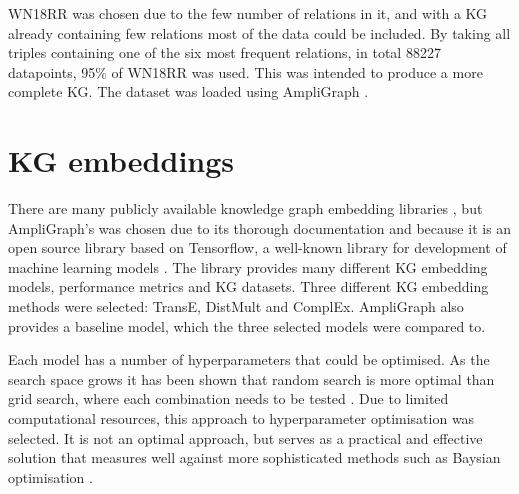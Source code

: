 WN18RR was chosen due to the few number of relations in it, and with a KG already containing few relations most of the data could be included.
By taking all triples containing one of the six most frequent relations, in total 88227 datapoints, 95\% of WN18RR was used. This was intended to produce a more complete KG. The dataset was loaded using AmpliGraph \cite{ampligraph}.

\section{KG embeddings}
There are many publicly available knowledge graph embedding libraries \cite{libkge, chandrahas-etal-2018-towards, ali2021pykeen}, but AmpliGraph's was chosen due to its thorough documentation and because it is an open source library based on Tensorflow, a well-known library for development of machine learning models \cite{tensorflow}. The library provides many different KG embedding models, performance metrics and KG datasets. Three different KG embedding methods were selected: TransE, DistMult and ComplEx. AmpliGraph also provides a baseline model, which the three selected models were compared to. 

Each model has a number of hyperparameters that could be optimised. As the search space grows it has been shown that random search is more optimal than grid search, where each combination needs to be tested \cite{bergstra2012random}. Due to limited computational resources, this approach to hyperparameter optimisation was selected. It is not an optimal approach, but serves as a practical and effective solution that measures well against more sophisticated methods such as Baysian optimisation \cite{li2017hyperband}.

